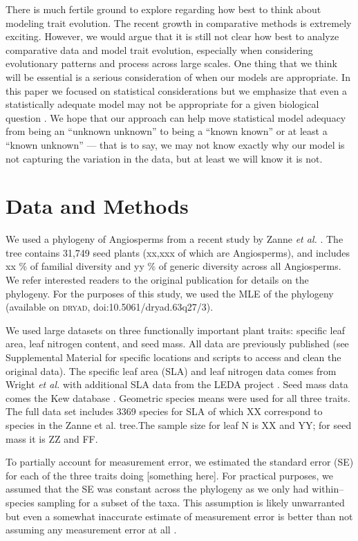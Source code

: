 \documentclass[a4paper,12pt]{article}
\begin{document}
There is much fertile ground to explore regarding how best to think about modeling trait evolution. The recent growth in comparative methods is extremely exciting. However, we would argue that it is still not clear how best to analyze comparative data and model trait evolution, especially when considering evolutionary patterns and process across large scales. One thing that we think will be essential is a serious consideration of when our models are appropriate. In this paper we focused on statistical considerations but we emphasize that even a statistically adequate model may not be appropriate for a given biological question \citep{Hansen2012}. We hope that our approach can help move statistical model adequacy from being an ``unknown unknown''  to being a ``known known'' or at least a ``known unknown'' --- that is to say, we may not know exactly why our model is not capturing the variation in the data, but at least we will know it is not.

\section{Data and Methods}

We used a phylogeny of Angiosperms from a recent study by Zanne \textit{et al.} \citep{Zanne2013}. The tree contains 31,749 seed plants (xx,xxx of which are Angiosperms), and includes xx \% of familial diversity and yy \% of generic diversity across all Angiosperms. We refer interested readers to the original publication \citep{Zanne2013} for details on the phylogeny. For the purposes of this study, we used the MLE of the phylogeny (available on \textsc{dryad}, doi:10.5061/dryad.63q27/3).

We used large datasets on three functionally important plant traits: specific leaf area, leaf nitrogen content, and seed mass.  All data are previously published (see Supplemental Material for specific locations and scripts to access and clean the original data). The specific leaf area (SLA) and leaf nitrogen data comes from Wright \textit{et al.} \citep{Wright2004} with additional SLA data from the LEDA project \citep{Kleyer2008}. Seed mass data comes the Kew database \citep{Kew2008}.  Geometric species means were used for all three traits.  The full data set includes 3369 species for SLA of which XX correspond to species in the Zanne et al. \citep{Zanne2013} tree.The sample size for leaf N is XX and YY; for seed mass it is ZZ and FF.  

To partially account for measurement error, we estimated the standard error (SE) for each of the three traits doing [something here]. For practical purposes, we assumed that the SE was constant across the phylogeny as we only had within--species sampling for a subset of the taxa. This assumption is likely unwarranted but even a somewhat inaccurate estimate of measurement error is better than not assuming any measurement error at all \citep{Hansen2012}.
\end{document}
